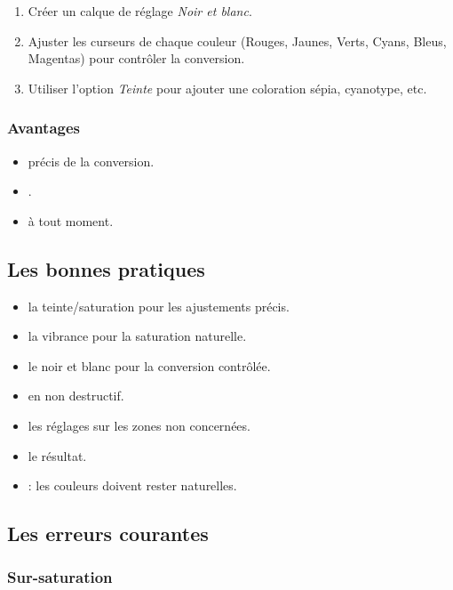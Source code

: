 \begin{enumerate}
    \item Créer un calque de réglage \emph{Noir et blanc}.
    \item Ajuster les curseurs de chaque couleur (Rouges, Jaunes, Verts, Cyans, Bleus, Magentas) pour contrôler la conversion.
    \item Utiliser l'option \emph{Teinte} pour ajouter une coloration sépia, cyanotype, etc.
\end{enumerate}

\subsubsection{Avantages}

\begin{itemize}
    \item {} précis de la conversion.
    \item {}.
    \item {} à tout moment.
\end{itemize}

\subsection{Les bonnes pratiques}

\begin{itemize}
    \item {} la teinte/saturation pour les ajustements précis.
    \item {} la vibrance pour la saturation naturelle.
    \item {} le noir et blanc pour la conversion contrôlée.
    \item {} en non destructif.
    \item {} les réglages sur les zones non concernées.
    \item {} le résultat.
    \item {} : les couleurs doivent rester naturelles.
\end{itemize}

\subsection{Les erreurs courantes}

\subsubsection{Sur-saturation}

